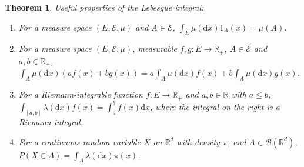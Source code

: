 \documentclass[english,twoside,openright]{HYgraduMLDS}
\newtheorem{theorem}{Theorem}
\newcommand{\R}{\mathbb{R}}
\newcommand{\dx}{\mathrm{d}}
\begin{document}
\begin{theorem}
  Useful properties of the Lebesgue integral:
	\begin{enumerate}
    \item For a measure space \((E, \mathcal{E}, \mu)\) and
          \(A\in \mathcal{E}\), \(\int_{E}\mu(\dx x)1_{A}(x) = \mu(A)\).
    \item For a measure space \((E, \mathcal{E}, \mu)\), measurable
          \(f, g\colon E\to \R_{+}\), \(A\in \mathcal{E}\) and \(a, b\in \R_{+}\),
          \(\int_{A} \mu(\dx x)(af(x) + bg(x))
          = a\int_{A} \mu(\dx x) f(x) + b\int_{A} \mu(\dx x) g(x)\).
    \item For a Riemann-integrable function \(f\colon E\to \R_{+}\) and
          \(a, b\in \R\) with \(a \leq b\),
          \(\int_{[a, b]}\lambda(\dx x)f(x) = \int_{a}^{b}f(x)\dx x\),
          where the integral on the right is a Riemann integral.
    \item For a continuous random variable \(X\) on \(\R^{d}\) with
          density \(\pi\), and \(A\in \mathcal{B}(\R^{d})\),
          \(P(X\in A) = \int_{A}\lambda(\dx x)\pi(x)\).
  \end{enumerate}
\end{theorem}

\end{document}

